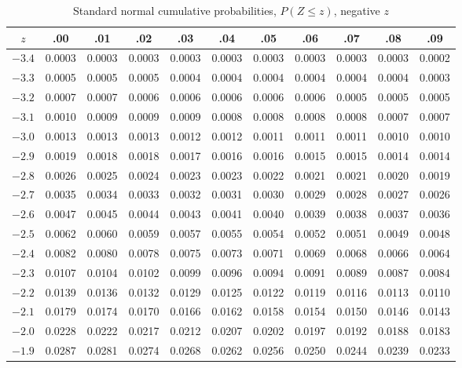 \begin{table}[H]
\centering
\small
\caption{Standard normal cumulative probabilities, $P(Z \le z)$, negative $z$}
\label{tab:z-negative}
\begin{tabular}{c|cccccccccc}
$z$ & .00 & .01 & .02 & .03 & .04 & .05 & .06 & .07 & .08 & .09 \\
\hline
$-3.4$ & 0.0003 & 0.0003 & 0.0003 & 0.0003 & 0.0003 & 0.0003 & 0.0003 & 0.0003 & 0.0003 & 0.0002 \\
$-3.3$ & 0.0005 & 0.0005 & 0.0005 & 0.0004 & 0.0004 & 0.0004 & 0.0004 & 0.0004 & 0.0004 & 0.0003 \\
$-3.2$ & 0.0007 & 0.0007 & 0.0006 & 0.0006 & 0.0006 & 0.0006 & 0.0006 & 0.0005 & 0.0005 & 0.0005 \\
$-3.1$ & 0.0010 & 0.0009 & 0.0009 & 0.0009 & 0.0008 & 0.0008 & 0.0008 & 0.0008 & 0.0007 & 0.0007 \\
$-3.0$ & 0.0013 & 0.0013 & 0.0013 & 0.0012 & 0.0012 & 0.0011 & 0.0011 & 0.0011 & 0.0010 & 0.0010 \\
$-2.9$ & 0.0019 & 0.0018 & 0.0018 & 0.0017 & 0.0016 & 0.0016 & 0.0015 & 0.0015 & 0.0014 & 0.0014 \\
$-2.8$ & 0.0026 & 0.0025 & 0.0024 & 0.0023 & 0.0023 & 0.0022 & 0.0021 & 0.0021 & 0.0020 & 0.0019 \\
$-2.7$ & 0.0035 & 0.0034 & 0.0033 & 0.0032 & 0.0031 & 0.0030 & 0.0029 & 0.0028 & 0.0027 & 0.0026 \\
$-2.6$ & 0.0047 & 0.0045 & 0.0044 & 0.0043 & 0.0041 & 0.0040 & 0.0039 & 0.0038 & 0.0037 & 0.0036 \\
$-2.5$ & 0.0062 & 0.0060 & 0.0059 & 0.0057 & 0.0055 & 0.0054 & 0.0052 & 0.0051 & 0.0049 & 0.0048 \\
$-2.4$ & 0.0082 & 0.0080 & 0.0078 & 0.0075 & 0.0073 & 0.0071 & 0.0069 & 0.0068 & 0.0066 & 0.0064 \\
$-2.3$ & 0.0107 & 0.0104 & 0.0102 & 0.0099 & 0.0096 & 0.0094 & 0.0091 & 0.0089 & 0.0087 & 0.0084 \\
$-2.2$ & 0.0139 & 0.0136 & 0.0132 & 0.0129 & 0.0125 & 0.0122 & 0.0119 & 0.0116 & 0.0113 & 0.0110 \\
$-2.1$ & 0.0179 & 0.0174 & 0.0170 & 0.0166 & 0.0162 & 0.0158 & 0.0154 & 0.0150 & 0.0146 & 0.0143 \\
$-2.0$ & 0.0228 & 0.0222 & 0.0217 & 0.0212 & 0.0207 & 0.0202 & 0.0197 & 0.0192 & 0.0188 & 0.0183 \\
$-1.9$ & 0.0287 & 0.0281 & 0.0274 & 0.0268 & 0.0262 & 0.0256 & 0.0250 & 0.0244 & 0.0239 & 0.0233 \\

\end{tabular}
\end{table}
